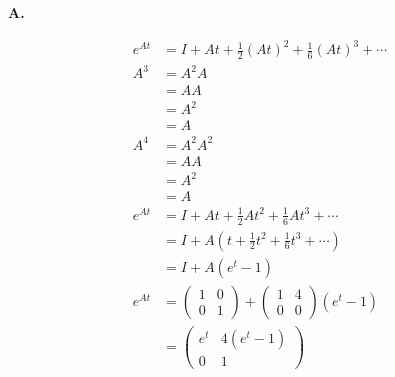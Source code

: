 \documentclass[main.tex]{subfiles}
\begin{document}
\begin{enumerate}
    \textbf{A.}

    $$
    \begin{aligned}
    e^{A t}&=I+A t+\frac{1}{2}(A t)^{2}+\frac{1}{6}(A t)^{3}+\cdots\\
    A^{3} &=A^{2} A \\
    &=A A \\
    &=A^{2} \\
    &=A \\
    A^{4} &=A^{2} A^{2} \\
    &=A A \\
    &=A^{2} \\
    &=A\\
    e^{A t} &=I+A t+\frac{1}{2} A t^{2}+\frac{1}{6} A t^{3}+\cdots \\
    &=I+A\left(t+\frac{1}{2} t^{2}+\frac{1}{6} t^{3}+\cdots\right) \\
    &=I+A\left(e^{t}-1\right)\\
    e^{A t} &=\left(\begin{array}{ll}
    1 & 0 \\
    0 & 1
    \end{array}\right)+\left(\begin{array}{ll}
    1 & 4 \\
    0 & 0
    \end{array}\right)\left(e^{t}-1\right) \\
    &=\left(\begin{array}{cc}
    e^{t} & 4\left(e^{t}-1\right) \\
    0 & 1
    \end{array}\right)
    \end{aligned}
    $$
    
\end{enumerate}
\end{document}
